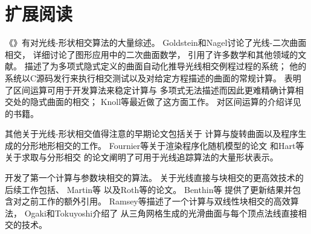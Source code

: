 \section{扩展阅读}\label{sec:扩展阅读03}
《》有对光线-形状相交算法的大量综述\citep{10.5555/94788}。
Goldstein和Nagel\parencite*{doi:10.1177/003754977101600104}讨论了光线-二次曲面相交，
\citet{Heckbert84themathematics}详细讨论了图形应用中的二次曲面数学，
引用了许多数学和其他领域的文献。
\citet{10.1145/964967.801136}描述了为多项式隐式定义的曲面自动化推导光线相交例程过程的系统；
他的系统以C源码发行来执行相交测试以及对给定方程描述的曲面的常规计算。
\citet{10.5555/93267.93276}表明了区间运算可用于开发算法来稳定计算与
多项式无法描述而因此更难精确计算相交处的隐式曲面的相交；
Knoll等\parencite*{10.1111/j.1467-8659.2008.01189.x}最近做了这方面工作。
对区间运算的介绍详见\citet{moore1966interval}的书籍。

其他关于光线-形状相交值得注意的早期论文包括\citet{10.1145/800059.801137}关于
计算与旋转曲面以及程序生成的分形地形相交的工作。
Fournier等\parencite*{10.1145/358523.358553}关于渲染程序化随机模型的论文
和Hart等\parencite*{10.1145/74334.74363}关于求取与分形相交
的论文阐明了可用于光线追踪算法的大量形状表示。

\citet{10.1145/800064.801287}开发了第一个计算与参数块相交的算法。
关于光线直接与块相交的更高效技术的后续工作包括\citet{722295}、
Martin等\parencite*{doi:10.1080/10867651.2000.10487519}
以及Roth等\parencite*{https://doi.org/10.1111/1467-8659.00535}的论文。
Benthin等\parencite*{doi:10.1080/2151237X.2006.10129218}
提供了更新结果并包含对之前工作的额外引用。
Ramsey等\parencite*{doi:10.1080/10867651.2004.10504896}描述了一个计算与双线性块相交的高效算法，
Ogaki和Tokuyoshi\parencite*{10.1111/j.1467-8659.2011.01993.x}介绍了
从三角网格生成的光滑曲面与每个顶点法线直接相交的技术。
